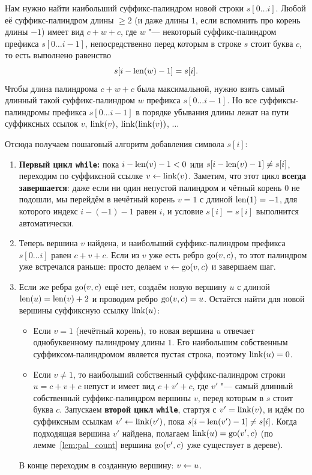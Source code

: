 Нам нужно найти наибольший суффикс-палиндром новой строки $s[0 \dots i]$. Любой её суффикс-палиндром длины $\ge 2$ (и даже длины $1$, если вспомнить про корень длины $-1$) имеет вид $c + w + c$, где $w$ "--- некоторый суффикс-палиндром префикса $s[0 \dots i-1]$, непосредственно перед которым в строке $s$ стоит буква $c$, то есть выполнено равенство
\[
    s[i - \operatorname{len}(w) - 1] = s[i].
\]
Чтобы длина палиндрома $c + w + c$ была максимальной, нужно взять самый длинный такой суффикс-палиндром $w$ префикса $s[0 \dots i-1]$. Но все суффиксы-палиндромы префикса $s[0 \dots i-1]$ в порядке убывания длины лежат на пути суффиксных ссылок $v$, $\operatorname{link}(v)$, $\operatorname{link}(\operatorname{link}(v))$, $\dots$

Отсюда получаем пошаговый алгоритм добавления символа $s[i]$:
\begin{enumerate}
    \item \textbf{Первый цикл \texttt{while}:} пока $i - \operatorname{len}(v) - 1 < 0$ или $s[i - \operatorname{len}(v) - 1] \ne s[i]$, переходим по суффиксной ссылке $v \leftarrow \operatorname{link}(v)$. Заметим, что этот цикл \textbf{всегда завершается}: даже если ни один непустой палиндром и чётный корень $0$ не подошли, мы перейдём в нечётный корень $v = 1$ с длиной $\operatorname{len}(1) = -1$, для которого индекс $i - (-1) - 1$ равен $i$, и условие $s[i] = s[i]$ выполнится автоматически.
    \item Теперь вершина $v$ найдена, и наибольший суффикс-палиндром префикса $s[0 \dots i]$ равен $c + v + c$. Если из $v$ уже есть ребро $\operatorname{go}(v, c)$, то этот палиндром уже встречался раньше: просто делаем $v \leftarrow \operatorname{go}(v, c)$ и завершаем шаг.
    \item Если же ребра $\operatorname{go}(v, c)$ ещё нет, создаём новую вершину $u$ с длиной $\operatorname{len}(u) = \operatorname{len}(v) + 2$ и проводим ребро $\operatorname{go}(v, c) = u$. Остаётся найти для новой вершины суффиксную ссылку $\operatorname{link}(u)$:
    \begin{itemize}
        \item Если $v = 1$ (нечётный корень), то новая вершина $u$ отвечает однобуквенному палиндрому длины $1$. Его наибольшим собственным суффиксом-палиндромом является пустая строка, поэтому $\operatorname{link}(u) = 0$.
        \item Если $v \ne 1$, то наибольший собственный суффикс-палиндром строки $u = c + v + c$ непуст и имеет вид $c + v' + c$, где $v'$ "--- самый длинный собственный суффикс-палиндром вершины $v$, перед которым в $s$ стоит буква $c$. Запускаем \textbf{второй цикл \texttt{while}}, стартуя с $v' = \operatorname{link}(v)$, и идём по суффиксным ссылкам $v' \leftarrow \operatorname{link}(v')$, пока $s[i - \operatorname{len}(v') - 1] \ne s[i]$. Когда подходящая вершина $v'$ найдена, полагаем $\operatorname{link}(u) = \operatorname{go}(v', c)$ (по лемме~\ref{lem:pal_count} вершина $\operatorname{go}(v', c)$ уже существует в дереве).
    \end{itemize}
    В конце переходим в созданную вершину: $v \leftarrow u$.
\end{enumerate}

